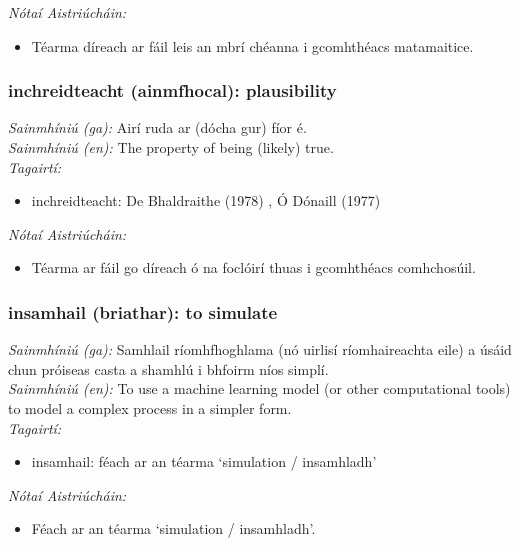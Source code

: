  \noindent \textit{Nótaí Aistriúcháin:}
\begin{itemize}
	\item Téarma díreach ar fáil leis an mbrí chéanna i gcomhthéacs matamaitice.
\end{itemize}


\subsubsection*{inchreidteacht (ainmfhocal): plausibility}
 \noindent \textit{Sainmhíniú (ga):} Airí ruda ar (dócha gur) fíor é.
\\
 \noindent \textit{Sainmhíniú (en):} The property of being (likely) true.
\\
 \noindent \textit{Tagairtí:}
\begin{itemize}
	\item inchreidteacht: De Bhaldraithe (1978) \cite{de-bhaldraithe}, Ó Dónaill (1977) \cite{odonaill}
\end{itemize}

 \noindent \textit{Nótaí Aistriúcháin:}
\begin{itemize}
	\item Téarma ar fáil go díreach ó na foclóirí thuas i gcomhthéacs comhchosúil.
\end{itemize}


\subsubsection*{insamhail (briathar): to simulate}
 \noindent \textit{Sainmhíniú (ga):} Samhlail ríomhfhoghlama (nó uirlisí ríomhaireachta eile) a úsáid chun próiseas casta a shamhlú i bhfoirm níos simplí.
\\
 \noindent \textit{Sainmhíniú (en):} To use a machine learning model (or other computational tools) to model a complex process in a simpler form.
\\
 \noindent \textit{Tagairtí:}
\begin{itemize}
	\item insamhail: féach ar an téarma `simulation / insamhladh'
\end{itemize}

 \noindent \textit{Nótaí Aistriúcháin:}
\begin{itemize}
	\item Féach ar an téarma `simulation / insamhladh'.
\end{itemize}


